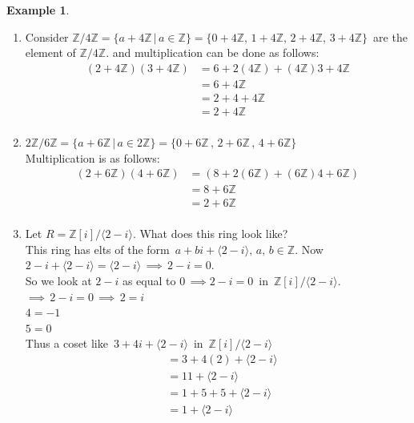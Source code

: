 \documentclass[11pt,a4paper]{article}
\theoremstyle{definition}
\newtheorem{exa}[thm]{Example}
\begin{document}
\begin{exa}
\begin{enumerate}
\item Consider $\mathbb{Z}/4\mathbb{Z}  = \{ a + 4\mathbb{Z}\, | \, a\in \mathbb{Z}\} = \{0 + 4\mathbb{Z},\, 1 + 4\mathbb{Z},\, 2 + 4\mathbb{Z},\, 3+4\mathbb{Z}\}\,$ are the element of $\mathbb{Z}/4\mathbb{Z}$. and multiplication can be done as follows:
\begin{align*}
(2 + 4\mathbb{Z})(3+ 4\mathbb{Z}) & = 6 + 2(4\mathbb{Z}) + (4\mathbb{Z})3 + 4\mathbb{Z}\\
& = 6 + 4\mathbb{Z}\\
& = 2 + 4 + 4\mathbb{Z}\\
& = 2 + 4\mathbb{Z}\\
\end{align*}



\item $2\mathbb{Z}\big/6\mathbb{Z} = \{a + 6\mathbb{Z}\, |\, a\in 2\mathbb{Z}\} = \{0 + 6\mathbb{Z}\, , \, 2 + 6\mathbb{Z}\, , \, 4 + 6\mathbb{Z}\}$\\

Multiplication is as follows:
\begin{align*}
(2 + 6\mathbb{Z})(4 + 6\mathbb{Z}) & = (8 + 2(6\mathbb{Z}) + (6\mathbb{Z}) 4 + 6\mathbb{Z})\\
& = 8 + 6\mathbb{Z}\\
& = 2 + 6\mathbb{Z}\\
\end{align*}

\item Let  $R = \mathbb{Z} [i]\big/\langle 2 - i\rangle$. \hspace{0.2cm} What does this ring look like?\\
This ring has elts of the form  $\, a + bi + \langle 2-i\rangle,\, a,\, b\in \mathbb{Z}$. Now $2 - i + \langle 2-i\rangle = \langle 2-i\rangle \, \implies\, 2-i = 0$.\\
So we look at $2-i$ as equal to $0 \, \implies 2-i = 0\,$ in $\,\mathbb{Z}[i]\big/\langle 2-i\rangle$.\\
$\implies \, 2 - i = 0 \, \implies\,  2 = i$\\
$ 4 = -1$\\
$ 5 = 0$\\

Thus a coset like $\, 3 + 4i + \langle 2-i\rangle\,$ in $\,\mathbb{Z}[i]\big/\langle 2-i\rangle$
\begin{align*}
& = 3 + 4(2) + \langle 2-i\rangle\\
& = 11 + \langle 2-i\rangle\\
& = 1 + 5 + 5 + \langle 2 - i\rangle\\
& = 1 + \langle 2-i\rangle\\\\
\end{align*}
\end{enumerate}
\end{exa}
\end{document}
